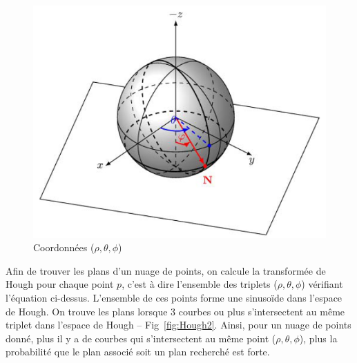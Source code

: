 ﻿\documentclass[12pt, twoside]{article}
\begin{document}
\begin{figure}[h]
\centering
\includegraphics[scale=0.5]{HoughCoord.png}
\caption{\label{fig:Hough1} Coordonnées ($\rho, \theta, \phi$)}
\end{figure}

Afin de trouver les plans d’un nuage de points, on calcule la transformée de Hough pour chaque point $p$, c’est à dire l’ensemble des triplets ($\rho, \theta, \phi$) vérifiant l’équation ci-dessus. L’ensemble de ces points forme une sinusoïde dans l’espace de Hough. On trouve les plans lorsque 3 courbes ou plus s’intersectent au même triplet dans l’espace de Hough -- Fig~\ref{fig:Hough2}. Ainsi, pour un nuage de points donné, plus il y a de courbes qui s’intersectent au même point ($\rho, \theta, \phi$), plus la probabilité que le plan associé soit un plan recherché est forte.
\end{document}
